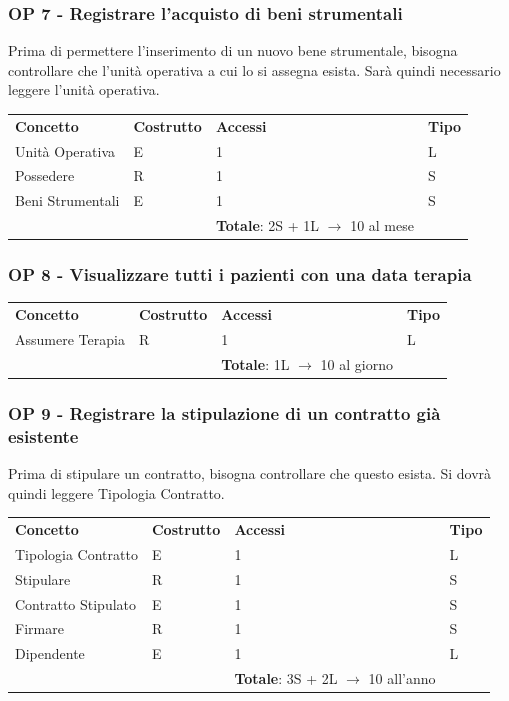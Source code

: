 \documentclass[a4paper, 12pt]{report}
\begin{document}
\subsubsection*{OP 7 - Registrare l'acquisto di beni strumentali}
Prima di permettere l'inserimento di un nuovo bene strumentale, bisogna controllare che l'unità operativa a
cui lo si assegna esista. Sarà quindi necessario leggere l'unità operativa. \par
\bigskip
\noindent
\begin{tabularx}{\textwidth}{XlXl}
        \rowcolor{seaGreen}
        \textbf{Concetto} & \textbf{Costrutto} & \textbf{Accessi} & \textbf{Tipo} \\
        Unità Operativa & E & 1 & L \\
        \hline
        Possedere & R & 1 & S \\
        \hline
        Beni Strumentali & E & 1 & S \\
        \rowcolor{seaGreen}
         &  & \textbf{Totale}: 2S + 1L $\rightarrow$ 10 al mese & \\
\end{tabularx}

\subsubsection*{OP 8 - Visualizzare tutti i pazienti con una data terapia}
\begin{tabularx}{\textwidth}{XlXl}
        \rowcolor{seaGreen}
        \textbf{Concetto} & \textbf{Costrutto} & \textbf{Accessi} & \textbf{Tipo} \\
        Assumere Terapia & R & 1 & L \\
        \rowcolor{seaGreen}
         &  & \textbf{Totale}: 1L $\rightarrow$ 10 al giorno & \\
\end{tabularx}

\subsubsection*{OP 9 - Registrare la stipulazione di un contratto già esistente}
Prima di stipulare un contratto, bisogna controllare che questo esista. Si dovrà quindi leggere Tipologia Contratto. \par
\bigskip
\noindent
\begin{tabularx}{\textwidth}{XlXl}
        \rowcolor{seaGreen}
        \textbf{Concetto} & \textbf{Costrutto} & \textbf{Accessi} & \textbf{Tipo} \\
        Tipologia Contratto & E & 1 & L \\
        \hline
        Stipulare & R & 1 & S \\
        \hline
        Contratto Stipulato & E & 1 & S \\
        \hline
        Firmare & R & 1 & S \\
        \hline
        Dipendente & E & 1 & L \\
        \rowcolor{seaGreen}
         &  & \textbf{Totale}: 3S + 2L $\rightarrow$ 10 all'anno & \\
\end{tabularx}
\end{document}
